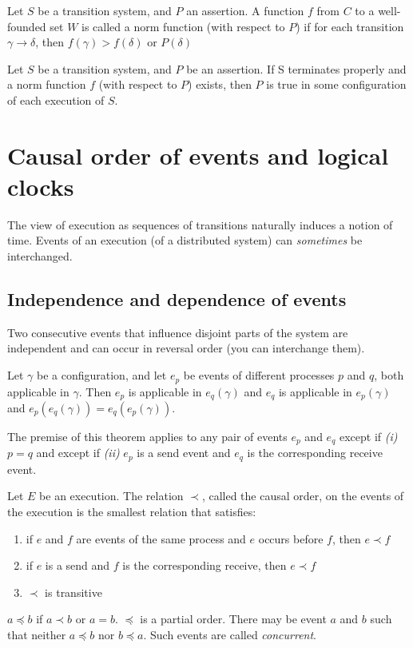 \begin{defi}
Let $S$ be a transition system, and $P$ an assertion. A function $f$ from $C$ to a well-founded set $W$ is called a norm function (with respect to $P$) if for each transition $\gamma \to \delta$, then $f(\gamma) > f(\delta)$ or $P(\delta)$
\end{defi}

\begin{thm}
Let $S$ be a transition system, and $P$ be an assertion. If S terminates properly and a norm function $f$ (with respect to $P$) exists, then $P$ is true in some configuration of each execution of $S$.
\end{thm}


\section{Causal order of events and logical clocks}
The view of execution as sequences of transitions naturally induces a notion of time. Events of an execution (of a distributed system) can \emph{sometimes} be interchanged.

\subsection{Independence and dependence of events}
Two consecutive events that influence disjoint parts of the system are independent and can occur in reversal order (you can interchange them).

\begin{thm}
Let $\gamma$ be a configuration, and let $e_p$ be events of different processes $p$ and $q$, both applicable in $\gamma$. Then $e_p$ is applicable in $e_q(\gamma)$ and $e_q$ is applicable in $e_p(\gamma)$ and $e_p(e_q(\gamma))=e_q(e_p(\gamma))$.
\end{thm}

The premise of this theorem applies to any pair of events $e_p$ and $e_q$ except if \textit{(i)} $p=q$ and except if \textit{(ii)} $e_p$ is a send event and $e_q$ is the corresponding receive event.

\begin{defi}
Let $E$ be an execution. The relation $\prec$, called the causal order, on the events of the execution is the smallest relation that satisfies:
\begin{enumerate}
\item if $e$ and $f$ are events of the same process and $e$ occurs before $f$, then $e\prec f$
\item if $e$ is a send and $f$ is the corresponding receive, then $e \prec f$
\item $\prec$ is transitive
\end{enumerate}

$a\preceq b$ if $a\prec b$ or $a=b$. $\preceq$ is a partial order. There may be event $a$ and $b$ such that neither $a \preceq b$ nor $b\preceq a$. Such events are called \emph{concurrent}.
\end{defi}


